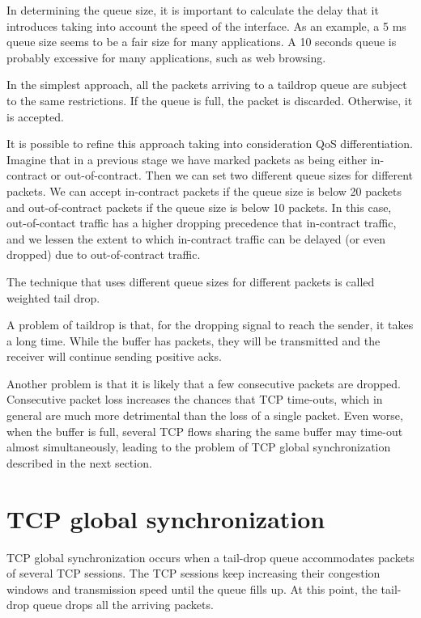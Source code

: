 In determining the queue size, it is important to calculate the delay that it introduces taking into account the speed of the interface.
As an example, a 5 ms queue size seems to be a fair size for many applications.
A 10 seconds queue is probably excessive for many applications, such as web browsing.

In the simplest approach, all the packets arriving to a taildrop queue are subject to the same restrictions.
If the queue is full, the packet is discarded.
Otherwise, it is accepted.

It is possible to refine this approach taking into consideration QoS differentiation.
Imagine that in a previous stage we have marked packets as being either in-contract or out-of-contract.
Then we can set two different queue sizes for different packets.
We can accept in-contract packets if the queue size is below 20 packets and out-of-contract packets if the queue size is below 10 packets.
In this case, out-of-contact traffic has a higher dropping precedence that in-contract traffic, and we lessen the extent to which in-contract traffic can be delayed (or even dropped) due to out-of-contract traffic.

The technique that uses different queue sizes for different packets is called weighted tail drop.

A problem of taildrop is that, for the dropping signal to reach the sender, it takes a long time.
While the buffer has packets, they will be transmitted and the receiver will continue sending positive acks.

Another problem is that it is likely that a few consecutive packets are dropped.
Consecutive packet loss increases the chances that TCP time-outs, which in general are much more detrimental than the loss of a single packet.
Even worse, when the buffer is full, several TCP flows sharing the same buffer may time-out almost simultaneously, leading to the problem of TCP global synchronization described in the next section.

\section{TCP global synchronization}

TCP global synchronization occurs when a tail-drop queue accommodates packets of several TCP sessions.
The TCP sessions keep increasing their congestion windows and transmission speed until the queue fills up.
At this point, the tail-drop queue drops all the arriving packets.


